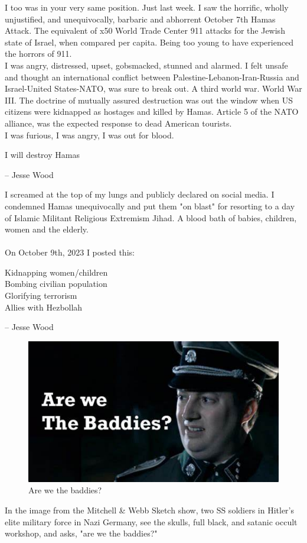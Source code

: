 \documentclass[16pt,openany,oneside]{book}
\begin{document}
I too was in your very same position. Just last week. I saw the horrific, wholly unjustified, and unequivocally, barbaric and abhorrent October 7th Hamas Attack. The equivalent of x50 World Trade Center 911 attacks for the Jewish state of Israel, when compared per capita. Being too young to have experienced the horrors of 911.
\\
I was angry, distressed, upset, gobsmacked, stunned and alarmed. I felt unsafe and thought an international conflict between Palestine-Lebanon-Iran-Russia and Israel-United States-NATO, was sure to break out. A third world war. World War III. The doctrine of mutually assured destruction was out the window when US citizens were kidnapped as hostages and killed by Hamas. Article 5 of the NATO alliance, was the expected response to dead American tourists. 
\\
I was furious, I was angry, I was out for blood. 

\epigraph{
I will destroy Hamas
}{-- Jesse Wood \cite{wood2023destroy}}

I screamed at the top of my lungs and publicly declared on social media. I condemned Hamas unequivocally and put them "on blast" for resorting to a day of Islamic Militant Religious Extremism Jihad. A blood bath of babies, children, women and the elderly.
\\\\
On October 9th, 2023 I posted this:

\epigraph{
    \> Kidnapping women/children \\ 
    \> Bombing civilian population \\ 
    \> Glorifying terrorism \\ 
    \> Allies with Hezbollah
}{-- Jesse Wood \cite{wood2023baddieshamas}}

\begin{figure} [H]
    \centering
    \includegraphics[width=0.5\linewidth]{assets/baddies.jpg}
    \caption{Are we the baddies?}
    \label{fig:baddies}
\end{figure}

In the image from the Mitchell \& Webb Sketch show, two SS soldiers in Hitler's elite military force in Nazi Germany, see the skulls, full black, and satanic occult workshop, and asks, "are we the baddies?"
    
\end{document}
